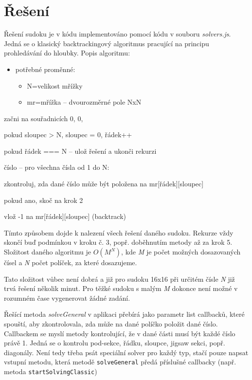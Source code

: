 \documentclass[a4paper,oneside,12pt]{report}
\begin{document}
\section{Řešení}
Řešení sudoku je v kódu implementováno pomocí kódu v souboru \textit{solvers.js}. Jedná se o klasický backtrackingový algoritmus pracující na principu prohledávání do hloubky. Popis algoritmu:
\begin{itemize}
	\item potřebné proměnné:
	\begin{itemize}
		\item N=velikost mřížky
		   \item mr=mřížka -- dvourozměrné pole NxN
	\end{itemize}
\end{itemize}
\begin{algEnumerate}
   \item začni na souřadnicích 0, 0,
   \item pokud sloupec > N, sloupec = 0, řádek++
   \item pokud řádek === N -- ulož řešení a ukonči rekurzi
   \item číslo -- pro všechna čísla od 1 do N:
   \begin{algEnumerate}
      \item zkontroluj, zda dané číslo může být položena na mr[řádek][sloupec]
      \item pokud ano, skoč na krok 2
   \end{algEnumerate}
   \item vlož -1 na mr[řádek][sloupec] (backtrack)
\end{algEnumerate}

Tímto způsobem dojde k nalezení všech řešení daného sudoku. Rekurze vždy skončí buď podmínkou v kroku č. 3, popř. doběhnutím metody až za krok 5. Složitost daného algoritmu je $O(M^{N})$, kde \textit{M} je počet možných dosazovaných čísel a \textit{N} počet políček, za které dosazujeme.

Tato složitost vůbec není dobrá a již pro sudoku 16x16 při určitém čísle \textit{N} již trvá řešení několik minut. Pro těžké sudoku s malým \textit{M} dokonce není možné v rozumném čase vygenerovat žádné zadání.

Řešící metoda \textit{solveGeneral} v aplikaci přebírá jako parametr list callbacků, které spouští, aby zkontrolovala, zda může na dané políčko položit dané číslo. Callbackem se myslí metody kontrolující, že v dané části musí být každé číslo právě 1. Jedná se o kontrolu pod-sekce, řádku, sloupce, jigsaw sekci, popř. diagonály. Není tedy třeba psát speciální solver pro každý typ, stačí pouze napsat vstupní metodu, která metodě \texttt{solveGeneral} předá příslušné callbacky (např. metoda \texttt{startSolvingClassic})
\end{document}
